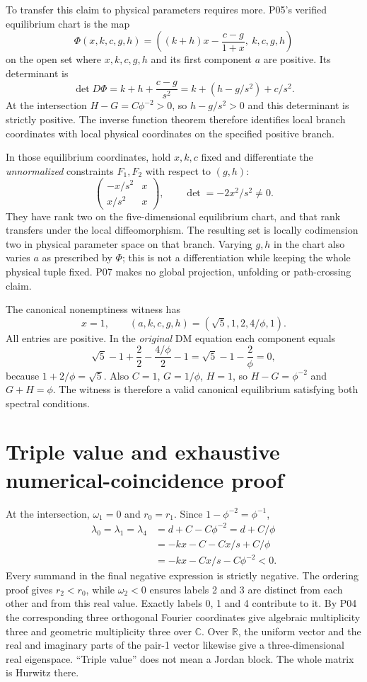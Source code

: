 \documentclass[11pt]{article}
\newcommand{\RR}{\mathbb R}
\newcommand{\CC}{\mathbb C}
\begin{document}
To transfer this claim to physical parameters requires more. P05's
verified equilibrium chart is the map
\[
 \Phi(x,k,c,g,h)=\left((k+h)x-\frac{c-g}{1+x},\ k,c,g,h\right)
\]
on the open set where $x,k,c,g,h$ and its first component $a$ are
positive. Its determinant is
\[
 \det D\Phi=k+h+\frac{c-g}{s^2}
             =k+(h-g/s^2)+c/s^2.
\]
At the intersection $H-G=C\phi^{-2}>0$, so
$h-g/s^2>0$ and this determinant is strictly positive. The inverse
function theorem therefore identifies local branch coordinates with
local physical coordinates on the specified positive branch.

In those equilibrium coordinates, hold $x,k,c$ fixed and differentiate
the \emph{unnormalized} constraints $F_1,F_2$ with respect to $(g,h)$:
\[
 \begin{pmatrix}-x/s^2&x\\ x/s^2&x\end{pmatrix},\qquad
 \det=-2x^2/s^2\ne0.
\]
They have rank two on the five-dimensional equilibrium chart, and that
rank transfers under the local diffeomorphism. The resulting set is
locally codimension two in physical parameter space on that branch.
Varying $g,h$ in the chart also varies $a$ as prescribed by $\Phi$;
this is not a differentiation while keeping the whole physical tuple
fixed. P07 makes no global projection, unfolding or path-crossing claim.

The canonical nonemptiness witness has
\[
 x=1,\qquad (a,k,c,g,h)=(\sqrt5,1,2,4/\phi,1).
\]
All entries are positive. In the \emph{original} DM equation each
component equals
\[
 \sqrt5-1+\frac22-\frac{4/\phi}{2}-1
 =\sqrt5-1-\frac2\phi=0,
\]
because $1+2/\phi=\sqrt5$. Also $C=1$, $G=1/\phi$, $H=1$,
so $H-G=\phi^{-2}$ and $G+H=\phi$. The witness is therefore a
valid canonical equilibrium satisfying both spectral conditions.

\section{Triple value and exhaustive numerical-coincidence proof}
\label{sec:coincidence}
At the intersection, $\omega_1=0$ and $r_0=r_1$. Since
$1-\phi^{-2}=\phi^{-1}$,
\begin{align*}
 \lambda_0=\lambda_1=\lambda_4
  &=d+C-C\phi^{-2}=d+C/\phi\\
  &=-kx-C-Cx/s+C/\phi\\
  &=-kx-Cx/s-C\phi^{-2}<0.
\end{align*}
Every summand in the final negative expression is strictly negative.
The ordering proof gives $r_2<r_0$, while $\omega_2<0$ ensures
labels 2 and 3 are distinct from each other and from this real value.
Exactly labels 0, 1 and 4 contribute to it. By P04 the corresponding
three orthogonal Fourier coordinates give algebraic multiplicity three
and geometric multiplicity three over $\CC$. Over $\RR$, the uniform
vector and the real and imaginary parts of the pair-1 vector likewise
give a three-dimensional real eigenspace. ``Triple value'' does not
mean a Jordan block. The whole matrix is Hurwitz there.
\end{document}
